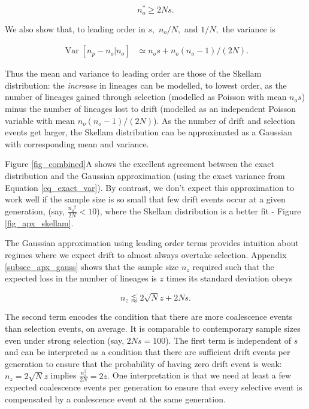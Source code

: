 \documentclass[9pt,twocolumn,twoside,lineno]{gsajnl}
\begin{document}
\begin{equation}
  \label{eq_critical_sample}
  n_o^* \ge 2N s.
\end{equation}

We also show that, to leading order in $s,$ $n_o/N,$ and $1/N,$ the variance is

\begin{equation}
  \begin{aligned}
    \operatorname{Var}[n_p-n_o | n_o] &\simeq
   n_o  s +   n_o (n_o-1)/(2 N).
    \label{eq_gauss_var}
  \end{aligned}
\end{equation}

Thus the mean and variance to leading order are those of the Skellam distribution: the
\textit{increase} in lineages can be modelled, to lowest order, as the number of lineages gained
through selection (modelled as Poisson with mean  $ n_o s$) minus the number of lineages lost to
drift (modelled as an independent Poisson variable with mean  $ n_o (n_o-1)/(2 N)$).
As the number of drift and selection events get larger, the Skellam distribution can be approximated as a
Gaussian with corresponding mean and variance.


Figure \ref{fig_combined}A shows the excellent agreement between the exact distribution and the
Gaussian approximation (using the exact variance from Equation \ref{eq_exact_var}). By contrast,
we don't expect this approximation to work well if the sample size is so small that few drift
events occur at a given generation, (say, $\frac{{n_o}^2}{2N} < 10$), where the Skellam
distribution is a better fit - Figure \ref{fig_apx_skellam}.

The Gaussian approximation using leading order terms provides intuition about regimes where we
expect drift to almost always overtake selection.  Appendix \ref{subsec_apx_gauss} shows that the sample size
$n_z$ required such that the expected loss in the number of lineages is $z$ times its standard deviation
obeys

\begin{equation}
  n_z \lessapprox 2 \sqrt{N} z + 2N s.
\label{eq_nz}
\end{equation}

The second term
encodes the condition that there are more coalescence events than selection events, on average. 
It is comparable to contemporary sample sizes even under strong selection (say, $2Ns=100$).
The
first term is independent of $s$ and can be interpreted as a condition that there are sufficient
drift events per generation to ensure that the probability of having zero drift event is weak: $n_z
= 2 \sqrt N z$ implies $\frac{n_z^2}{2N}= 2 z$. One interpretation is that we need at least a few
expected coalescence events per generation to ensure that every selective event is compensated by a
coalescence event at the same generation.
\end{document}

